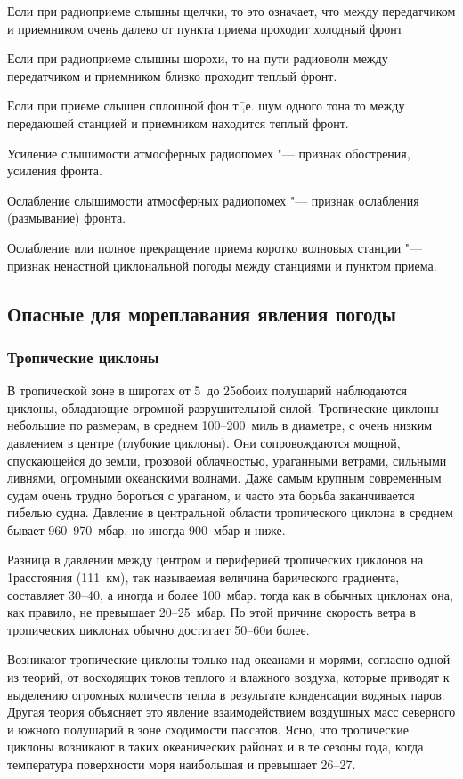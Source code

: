 Если при радиоприеме слышны щелчки, то это означает, что между
передатчиком и приемником очень далеко от пункта приема проходит
холодный фронт

 Если при радиоприеме слышны шорохи, то на пути радиоволн между
передатчиком и приемником близко проходит теплый фронт.

 Если при приеме слышен сплошной фон т.\=,е. шум одного тона то
между передающей станцией и приемником находится теплый фронт.

 Усиление слышимости атмосферных радиопомех "--- признак
обострения, усиления фронта.

 Ослабление слышимости атмосферных радиопомех "--- признак
ослабления (размывание) фронта.

 Ослабление или полное прекращение приема коротко волновых
станции "--- признак ненастной циклональной погоды между станциями и
пунктом приема.

\subsection{Опасные для мореплавания явления погоды}

\subsubsection{Тропические циклоны}

В тропической зоне в широтах от 5~до 25\gr обоих полушарий наблюдаются
циклоны, обладающие огромной разрушительной силой. Тропические циклоны
небольшие по размерам, в среднем 100--200~миль в диаметре, с очень
низким давлением в центре (глубокие циклоны). Они сопровождаются
мощной, спускающейся до земли, грозовой облачностью, ураганными
ветрами, сильными ливнями, огромными океанскими волнами. Даже самым
крупным современным судам очень трудно бороться с ураганом, и часто
эта борьба заканчивается гибелью судна. Давление в центральной области
тропического циклона в среднем бывает 960--970~мбар, но иногда 900~мбар
и ниже.

Разница в давлении между центром и периферией тропических циклонов на
1\gr расстояния (111~км), так называемая величина барического градиента,
составляет 30--40, а иногда и более 100~мбар. тогда как в обычных
циклонах она, как правило, не превышает 20--25~мбар. По этой причине
скорость ветра в тропических циклонах обычно достигает 50--60\speedms и
более.

Возникают тропические циклоны только над океанами и морями, согласно
одной из теорий, от восходящих токов теплого и влажного воздуха,
которые приводят к выделению огромных количеств тепла в результате
конденсации водяных паров. Другая теория объясняет это явление
взаимодействием воздушных масс северного и южного полушарий в зоне
сходимости пассатов. Ясно, что тропические циклоны возникают в таких
океанических районах и в те сезоны года, когда температура поверхности
моря наибольшая и превышает 26--27\gr.

